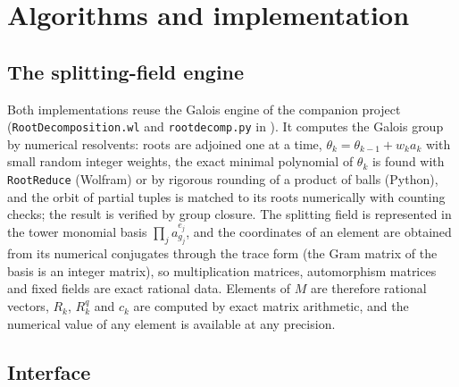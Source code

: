 \documentclass[11pt,a4paper]{article}
\theoremstyle{definition}
\theoremstyle{remark}
\newcommand{\code}[1]{\texttt{#1}}
\begin{document}
\section{Algorithms and implementation}\label{sec:impl}

\subsection{The splitting-field engine}\label{sec:engine}

Both implementations reuse the Galois engine of the companion project
(\code{RootDecomposition.wl} and \code{rootdecomp.py} in ).  It
computes the Galois group by numerical resolvents: roots are adjoined one at a time,
$\theta_{k}=\theta_{k-1}+w_ka_k$ with small random integer weights, the exact minimal
polynomial of $\theta_k$ is found with \code{RootReduce} (Wolfram) or by rigorous
rounding of a product of balls (Python), and the orbit of partial tuples is matched to
its roots numerically with counting checks; the result is verified by group closure.  The
splitting field is represented in the tower monomial basis $\prod_j a_{g_j}^{e_j}$, and
the coordinates of an element are obtained from its numerical conjugates through the
trace form (the Gram matrix of the basis is an integer matrix), so multiplication
matrices, automorphism matrices and fixed fields are exact rational data.  Elements of
$M$ are therefore rational vectors, $R_k$, $R_k^q$ and $c_k$ are computed by exact
matrix arithmetic, and the numerical value of any element is available at any precision.

\subsection{Interface}
\end{document}
